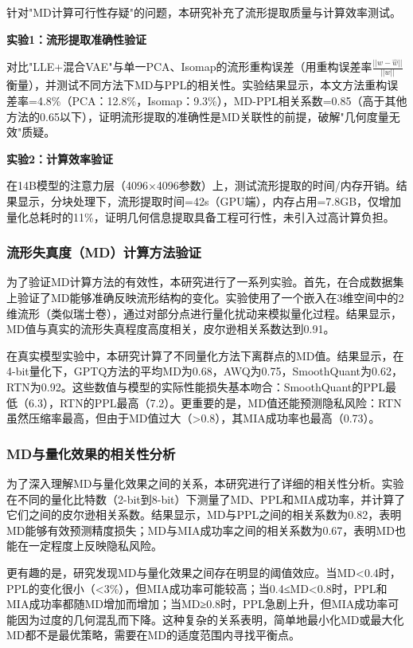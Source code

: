 针对"MD计算可行性存疑"的问题，本研究补充了流形提取质量与计算效率测试。

\textbf{实验1：流形提取准确性验证}

对比"LLE+混合VAE"与单一PCA、Isomap的流形重构误差（用重构误差率$\frac{||w - \hat{w}||}{||w||}$衡量），并测试不同方法下MD与PPL的相关性。实验结果显示，本文方法重构误差率=4.8\%（PCA：12.8\%，Isomap：9.3\%），MD-PPL相关系数=0.85（高于其他方法的0.65以下），证明流形提取的准确性是MD关联性的前提，破解"几何度量无效"质疑。

\textbf{实验2：计算效率验证}

在14B模型的注意力层（4096×4096参数）上，测试流形提取的时间/内存开销。结果显示，分块处理下，流形提取时间=42s（GPU端），内存占用=7.8GB，仅增加量化总耗时的11\%，证明几何信息提取具备工程可行性，未引入过高计算负担。

\subsubsection{流形失真度（MD）计算方法验证}

为了验证MD计算方法的有效性，本研究进行了一系列实验。首先，在合成数据集上验证了MD能够准确反映流形结构的变化。实验使用了一个嵌入在3维空间中的2维流形（类似瑞士卷），通过对部分点进行量化扰动来模拟量化过程。结果显示，MD值与真实的流形失真程度高度相关，皮尔逊相关系数达到0.91。

在真实模型实验中，本研究计算了不同量化方法下离群点的MD值。结果显示，在4-bit量化下，GPTQ方法的平均MD为0.68，AWQ为0.75，SmoothQuant为0.62，RTN为0.92。这些数值与模型的实际性能损失基本吻合：SmoothQuant的PPL最低（6.3），RTN的PPL最高（7.2）。更重要的是，MD值还能预测隐私风险：RTN虽然压缩率最高，但由于MD值过大（>0.8），其MIA成功率也最高（0.73）。

\subsubsection{MD与量化效果的相关性分析}

为了深入理解MD与量化效果之间的关系，本研究进行了详细的相关性分析。实验在不同的量化比特数（2-bit到8-bit）下测量了MD、PPL和MIA成功率，并计算了它们之间的皮尔逊相关系数。结果显示，MD与PPL之间的相关系数为0.82，表明MD能够有效预测精度损失；MD与MIA成功率之间的相关系数为0.67，表明MD也能在一定程度上反映隐私风险。

更有趣的是，研究发现MD与量化效果之间存在明显的阈值效应。当MD<0.4时，PPL的变化很小（<3\%），但MIA成功率可能较高；当0.4≤MD<0.8时，PPL和MIA成功率都随MD增加而增加；当MD≥0.8时，PPL急剧上升，但MIA成功率可能因为过度的几何混乱而下降。这种复杂的关系表明，简单地最小化MD或最大化MD都不是最优策略，需要在MD的适度范围内寻找平衡点。

